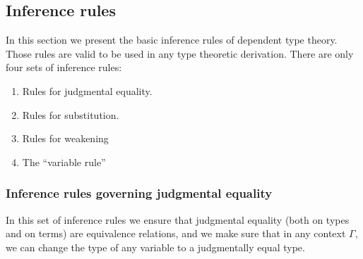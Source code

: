 \subsection{Inference rules}\label{sec:rules}

In this section we present the basic inference rules of dependent type theory. Those rules are valid to be used in any type theoretic derivation. There are only four sets of inference rules:
\begin{enumerate}
\item Rules for judgmental equality. 
\item Rules for substitution.
\item Rules for weakening
\item The ``variable rule''
\end{enumerate}

\subsubsection*{Inference rules governing judgmental equality}

In this set of inference rules we ensure that judgmental equality (both on types and on terms) are equivalence relations, and we make sure that in any context $\Gamma$, we can change the type of any variable to a judgmentally equal type.

